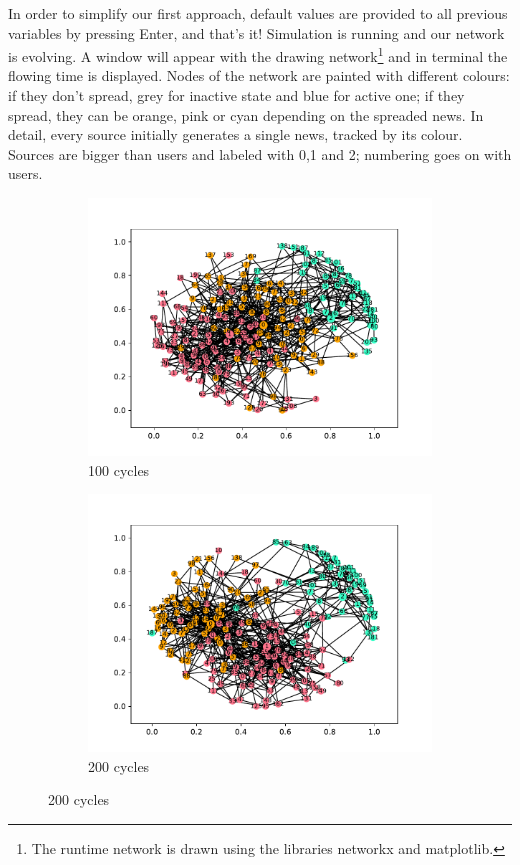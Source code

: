 In order to simplify our first approach, default values are provided to all previous variables by pressing Enter, and that's it!
Simulation is running and our network is evolving. A window will appear with the drawing network\footnote{The runtime network is drawn using the libraries networkx and matplotlib.} and in terminal the flowing time is displayed. 
Nodes of the network are painted with different colours: if they don't spread, grey for inactive state and blue for active one; if they spread, they can be orange, pink or cyan depending on the spreaded news. In detail, every source initially generates a single news, tracked by its colour. Sources are bigger than users and labeled with 0,1 and 2; numbering goes on with users.\\
\begin{figure}
  \centering
  \begin{subfigure}[t]{.45\textwidth}
    \centering
    \includegraphics[trim={1cm .5cm 1cm 1cm}, clip, width=\linewidth]{img/pdf/plot-0100.pdf} 
    \caption{100 cycles} \label{fig:100}
  \end{subfigure}
  \begin{subfigure}[t]{.45\textwidth}
    \centering
    \includegraphics[trim={1cm .5cm 1cm 1cm}, clip, width=\linewidth]{img/pdf/plot-0200.pdf} 
    \caption{200 cycles} \label{fig:200}
  \end{subfigure}


\end{figure}
